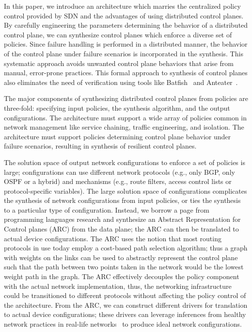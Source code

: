 In this paper, we introduce an architecture which marries the centralized
policy control provided by SDN and the advantages of using
distributed control planes. 
By carefully engineering the parameters determining the
behavior of a distributed control plane, 
we can synthesize control planes which
enforce a diverse set of policies. 
Since failure handling is 
performed in a distributed manner, the behavior of the control
plane under failure scenarios is incorporated in the synthesis. 
This systematic approach avoids unwanted
control plane behaviors that arise from manual, error-prone
practices. This
formal approach to synthesis of control planes also eliminates the need of 
verification using tools like Batfish~\cite{batfish} and Anteater~\cite{anteater}.

The major components of synthesizing distributed control planes from 
policies are three-fold: specifying input policies, the synthesis 
algorithm, and the output configurations. The architecture must 
support a wide array of policies common in network management like service
chaining, traffic engineering, and isolation. The architecture must
support policies determining control plane behavior under failure scenarios,
resulting in synthesis of resilient control planes. 

The solution space of output network configurations to enforce a set of policies
is large; configurations can use different 
network protocols (e.g., only BGP, only OSPF or a hybrid) and
mechanisms (e.g., route filters, access control lists
or protocol-specific variables). The large solution space
of configurations complicates the synthesis of
network configurations from
input policies, 
or ties the synthesis to a particular type of configuration. 
Instead, we borrow a page from programming languages
research and
synthesize an Abstract Representation for Control planes (ARC) from 
the data plane; the ARC can then be translated to actual device configurations.
The ARC uses the notion that most routing protocols in use 
today employ a cost-based path selection algorithm; thus a graph with
weights on the links can be used to abstractly represent the control plane such that 
the path between two points taken in the network would be 
the lowest weight path in the graph. 
The ARC effectively decouples the policy component with the 
actual network implementation, thus, the networking infrastructure could be
transitioned to different protocols without affecting the policy 
control of the architecture. From the ARC, we can construct different
drivers for translation to actual device configurations; these drivers
can leverage inferences from healthy network practices in 
real-life networks~\cite{mpa-imc15} to produce ideal network configurations.

